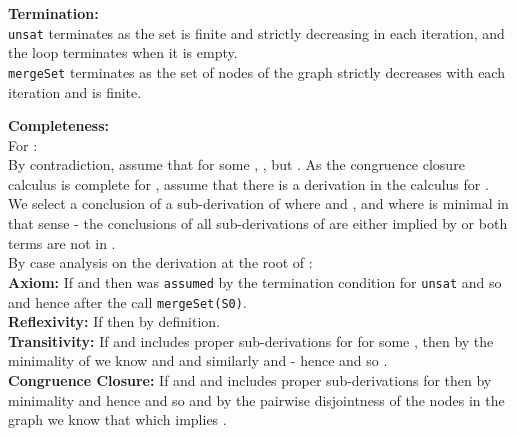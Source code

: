 \begin{theorem}
\noindent
\textbf{Termination:} \\
\lstinline{unsat} terminates as the set  is finite and strictly decreasing in each iteration, and the loop terminates when it is empty.\\
\lstinline{mergeSet} terminates as the set of nodes of the graph strictly decreases with each iteration and is finite.

\noindent
\textbf{Completeness:}\\
For :\\
By contradiction, assume that for some , , but .
As the congruence closure calculus is complete for , assume that there is a derivation  in the calculus for .\\
We select a conclusion  of a sub-derivation  of  where  and , and where  is minimal in that sense - the conclusions of all sub-derivations of  are either implied by  or both terms are not in .\\
By case analysis on the derivation at the root of :\\
\textbf{Axiom:} If  and  then  was \lstinline{assumed} by the termination condition for \lstinline{unsat} and so  and hence  after the call \lstinline{mergeSet(S0)}.\\
\textbf{Reflexivity:} If  then  by definition.\\
\textbf{Transitivity:} If  and  includes proper sub-derivations for  for some , then by the minimality of  we know  and  and similarly  and  - hence  and so .\\
\textbf{Congruence Closure:} If  and  and  includes proper sub-derivations for  then by minimality  and hence  and so  and by the pairwise disjointness of the nodes in the graph we know that  which implies .

\end{theorem}

